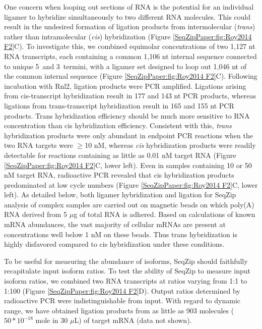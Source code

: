 		One concern when looping out sections of RNA is the potential for an individual ligamer to hybridize simultaneously to two different RNA molecules. This could result in the undesired formation of ligation products from intermolecular (\textit{trans}) rather than intramolecular (\textit{cis}) hybridization (Figure \ref{SeqZipPaper:fig:Roy2014 F2}C). To investigate this, we combined equimolar concentrations of two 1,127 nt RNA transcripts, each containing a common 1,106 nt internal sequence connected to unique 5\textprime~and 3\textprime~termini, with a ligamer set designed to loop out 1,046 nt of the common internal sequence (Figure \ref{SeqZipPaper:fig:Roy2014 F2}C). Following incubation with Rnl2, ligation products were PCR amplified. Ligations arising from cis-transcript hybridization result in 177 and 143 nt PCR products, whereas ligations from trans-transcript hybridization result in 165 and 155 nt PCR products. Trans hybridization efficiency should be much more sensitive to RNA concentration than cis hybridization efficiency. Consistent with this, \textit{trans} hybridization products were only abundant in endpoint PCR reactions when the two RNA targets were $\ge$10 nM, whereas \textit{cis} hybridization products were readily detectable for reactions containing as little as 0.01 nM target RNA (Figure \ref{SeqZipPaper:fig:Roy2014 F2}C, lower left). Even in samples containing 10 or 50 nM target RNA, radioactive PCR revealed that cis hybridization products predominated at low cycle numbers (Figure \ref{SeqZipPaper:fig:Roy2014 F2}C, lower left). As detailed below, both ligamer hybridization and ligation for SeqZip analysis of complex samples are carried out on magnetic beads on which poly(A) RNA derived from 5 $\mu$g of total RNA is adhered. Based on calculations of known mRNA abundances, the vast majority of cellular mRNAs are present at concentrations well below 1 nM on these beads. Thus trans hybridization is highly disfavored compared to cis hybridization under these conditions.

		To be useful for measuring the abundance of isoforms, SeqZip should faithfully recapitulate input isoform ratios. To test the ability of SeqZip to measure input isoform ratios, we combined two RNA transcripts at ratios varying from 1:1 to 1:100 (Figure \ref{SeqZipPaper:fig:Roy2014 F2}D). Output ratios determined by radioactive PCR were indistinguishable from input. With regard to dynamic range, we have obtained ligation products from as little as 903 molecules ($50 * 10^{-18}$ mole in 30 $\mu$L) of target mRNA (data not shown).

